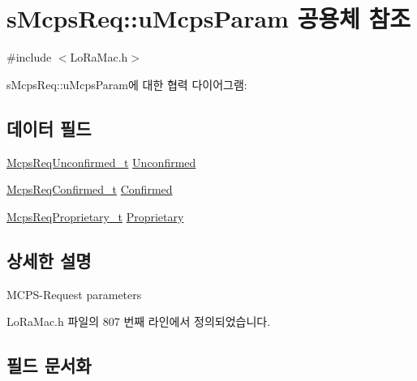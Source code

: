 \hypertarget{unions_mcps_req_1_1u_mcps_param}{}\section{s\+Mcps\+Req\+:\+:u\+Mcps\+Param 공용체 참조}
\label{unions_mcps_req_1_1u_mcps_param}


{\ttfamily \#include $<$Lo\+Ra\+Mac.\+h$>$}



s\+Mcps\+Req\+:\+:u\+Mcps\+Param에 대한 협력 다이어그램\+:
\subsection*{데이터 필드}
\begin{DoxyCompactItemize}
\item 
\mbox{\hyperlink{group___l_o_r_a_m_a_c_gaab871b914dfa4013c176586dcc2ea6df}{Mcps\+Req\+Unconfirmed\+\_\+t}} \mbox{\hyperlink{unions_mcps_req_1_1u_mcps_param_a490d6060b7d5f999539375d160304e9c}{Unconfirmed}}
\item 
\mbox{\hyperlink{group___l_o_r_a_m_a_c_ga02103c0ee1374a6b1eec217f148ec0e2}{Mcps\+Req\+Confirmed\+\_\+t}} \mbox{\hyperlink{unions_mcps_req_1_1u_mcps_param_aa6b3511826dee52ed1b057c1762f4afa}{Confirmed}}
\item 
\mbox{\hyperlink{group___l_o_r_a_m_a_c_gac856bc282e89301412e0a294b3e663c4}{Mcps\+Req\+Proprietary\+\_\+t}} \mbox{\hyperlink{unions_mcps_req_1_1u_mcps_param_ad79bb26667e5f61b5e5dd5d58a085b48}{Proprietary}}
\end{DoxyCompactItemize}


\subsection{상세한 설명}
M\+C\+P\+S-\/\+Request parameters 

Lo\+Ra\+Mac.\+h 파일의 807 번째 라인에서 정의되었습니다.



\subsection{필드 문서화}
\mbox{\label{unions_mcps_req_1_1u_mcps_param_aa6b3511826dee52ed1b057c1762f4afa}} 
